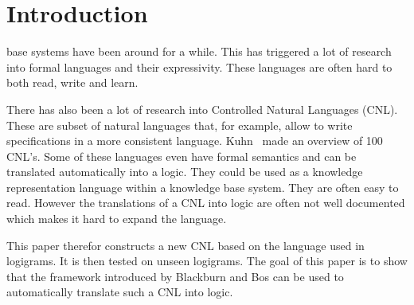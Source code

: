 \section{Introduction}

 base systems have been around for a while. This has triggered a lot of research into formal languages and their expressivity. These languages are often hard to both read, write and learn.

There has also been a lot of research into Controlled Natural Languages (CNL). These are subset of natural languages that, for example, allow to write specifications in a more consistent language. Kuhn~\cite{Kuhn2014} made an overview of 100 CNL's. Some of these languages even have formal semantics and can be translated automatically into a logic. They could be used as a knowledge representation language within a knowledge base system. They are often easy to read. However the translations of a CNL into logic are often not well documented which makes it hard to expand the language.

This paper therefor constructs a new CNL based on the language used in logigrams. It is then tested on unseen logigrams. The goal of this paper is to show that the framework introduced by Blackburn and Bos \cite{Blackburn2005, Blackburn2006} can be used to automatically translate such a CNL into logic.
